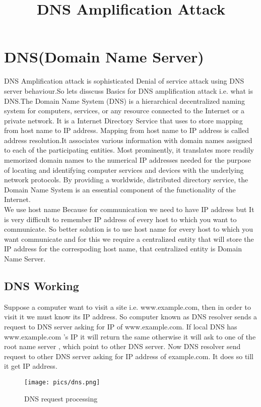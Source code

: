 \documentclass[11pt]{article}
\date{\vspace{-5ex}}
\title{\bf{DNS Amplification Attack}}
\date{}
\begin{document}
\maketitle

\newpage
\section*{DNS(Domain Name Server)}
DNS Amplification attack is sophisticated Denial of service attack using DNS server behaviour.So lets disscuss Basics for DNS amplification attack i.e. what is DNS.The Domain Name System (DNS) is a hierarchical decentralized naming system for computers, services, or any resource connected to the Internet or a private network.  It is a Internet Directory Service that uses to store mapping from host name to IP address. Mapping from host name to IP address is called address resolution.It associates various information with domain names assigned to each of the participating entities. Most prominently, it translates more readily memorized domain names to the numerical IP addresses needed for the purpose of locating and identifying computer services and devices with the underlying network protocols. By providing a worldwide, distributed directory service, the Domain Name System is an essential component of the functionality of the Internet.
\\
We use host name Because for communication we need to have IP address but It is very difficult to remember IP address of every host to which you want to communicate. So better solution is to use host name for every host to which you want communicate and for this we require a centralized entity that will store the IP address for the correspoding host name, that centralized entity is Domain Name Server.
\subsection{DNS Working}
Suppose a computer want to visit a site i.e. www.example.com, then in order to visit it we must know its IP address. So computer known as DNS resolver sends a request to DNS server asking for IP of www.example.com. If local DNS has www.example.com 's IP it will return the same otherwise it will ask to one of the root name server , which point to other DNS server. Now DNS resolver send request to other DNS server asking for IP address of example.com. It does so till it get IP address. 
\begin{figure}
\texttt{[image: pics/dns.png]}
\caption{DNS request processing}
\end{figure}
\end{document}
